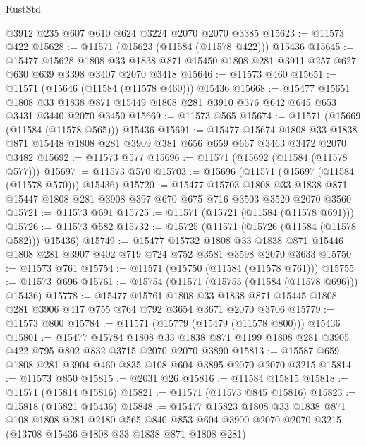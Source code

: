\begin{lexlean}{RustStd}
\begin{coremodule}
    @3912
    @235
    @607
    @610
    @624
    @3224
    @2070
    @2070
    @3385
@15623 := @11573 @422
@15628 := @11571 (@15623 (@11584 (@11578 @422))) @15436
@15645 := @15477
    @15628
    @1808
    @33
    @1838
    @871
    @15450
    @1808
    @281
    @3911
    @257
    @627
    @630
    @639
    @3398
    @3407
    @2070
    @3418
@15646 := @11573 @460
@15651 := @11571 (@15646 (@11584 (@11578 @460))) @15436
@15668 := @15477
    @15651
    @1808
    @33
    @1838
    @871
    @15449
    @1808
    @281
    @3910
    @376
    @642
    @645
    @653
    @3431
    @3440
    @2070
    @3450
@15669 := @11573 @565
@15674 := @11571 (@15669 (@11584 (@11578 @565))) @15436
@15691 := @15477
    @15674
    @1808
    @33
    @1838
    @871
    @15448
    @1808
    @281
    @3909
    @381
    @656
    @659
    @667
    @3463
    @3472
    @2070
    @3482
@15692 := @11573 @577
@15696 := @11571 (@15692 (@11584 (@11578 @577)))
@15697 := @11573 @570
@15703 := @15696 (@11571 (@15697 (@11584 (@11578 @570))) @15436)
@15720 := @15477
    @15703
    @1808
    @33
    @1838
    @871
    @15447
    @1808
    @281
    @3908
    @397
    @670
    @675
    @716
    @3503
    @3520
    @2070
    @3560
@15721 := @11573 @691
@15725 := @11571 (@15721 (@11584 (@11578 @691)))
@15726 := @11573 @582
@15732 := @15725 (@11571 (@15726 (@11584 (@11578 @582))) @15436)
@15749 := @15477
    @15732
    @1808
    @33
    @1838
    @871
    @15446
    @1808
    @281
    @3907
    @402
    @719
    @724
    @752
    @3581
    @3598
    @2070
    @3633
@15750 := @11573 @761
@15754 := @11571 (@15750 (@11584 (@11578 @761)))
@15755 := @11573 @696
@15761 := @15754 (@11571 (@15755 (@11584 (@11578 @696))) @15436)
@15778 := @15477
    @15761
    @1808
    @33
    @1838
    @871
    @15445
    @1808
    @281
    @3906
    @417
    @755
    @764
    @792
    @3654
    @3671
    @2070
    @3706
@15779 := @11573 @800
@15784 := @11571 (@15779 (@15479 (@11578 @800))) @15436
@15801 := @15477
    @15784
    @1808
    @33
    @1838
    @871
    @1199
    @1808
    @281
    @3905
    @422
    @795
    @802
    @832
    @3715
    @2070
    @2070
    @3890
@15813 := @15587 @659 @1808 @281 @3904 @460 @835 @108 @604 @3895 @2070 @2070 @3215
@15814 := @11573 @850
@15815 := @2031 @26
@15816 := @11584 @15815
@15818 := @11571 (@15814 @15816)
@15821 := @11571 (@11573 @845 @15816)
@15823 := @15818 (@15821 @15436)
@15848 := @15477
    @15823
    @1808
    @33
    @1838
    @871
    @108
    @1808
    @281
    @2180
    @565
    @840
    @853
    @604
    @3900
    @2070
    @2070
    @3215
    (@13708 @15436 @1808 @33 @1838 @871 @1808 @281)

\end{coremodule}
\end{lexlean}

